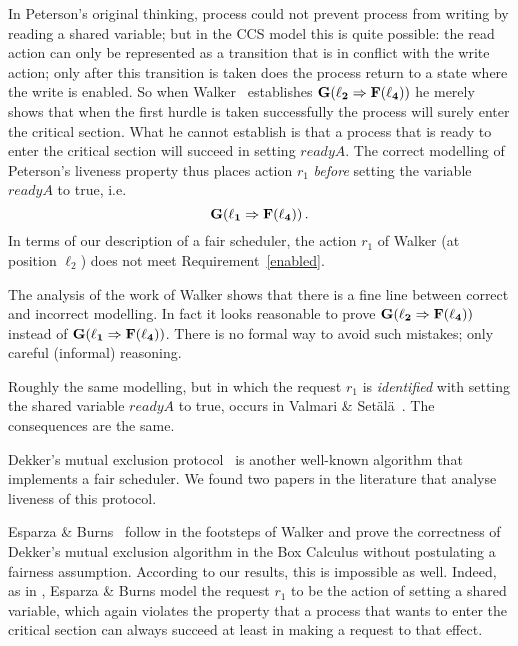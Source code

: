 \documentclass[smallcondensed]{svjour3}
\newcommand{\mand}{\&\xspace}
\begin{document}
In Peterson's
original thinking, process \procB could not prevent process \procA
from writing by reading a shared variable; but in the CCS model this is
quite possible: the read action can only be represented as a transition that is in conflict with the write action;
only after this transition is taken does the process return to a state where the write is enabled.
So when Walker~\cite{Walker89} establishes $\bf{G}(\ell_{2}\Rightarrow{\bf F}(\ell_{4}))$
he merely shows that when the first hurdle is taken successfully
the process will surely enter the critical section. What he cannot establish
is that a process that is ready to enter the
critical section will succeed in setting $readyA$. 
The correct modelling of Peterson's liveness property
thus places action $r_1$ \emph{before} setting the variable $readyA$ to true, i.e.\
\[
\bf{G}(\ell_{1}\Rightarrow{\bf F}(\ell_{4}))\,.
\]
In terms of our description of a fair scheduler, the action $r_1$ of
Walker (at position $\ell_2$) does not meet Requirement~\ref{enabled}.

The analysis of the work of Walker shows that there is a fine line between 
correct and incorrect modelling. In fact it looks reasonable to prove 
$\bf{G}(\ell_{2}\Rightarrow{\bf F}(\ell_{4}))$ instead of 
$\bf{G}(\ell_{1}\Rightarrow{\bf F}(\ell_{4}))$. There is
no formal way to avoid such mistakes; only careful (informal) reasoning.

Roughly the same modelling, but in which the
request $r_1$ is \emph{identified}
with setting the shared variable $readyA$ to true,
occurs in Valmari \mand Set\"{a}l\"{a}~\cite{Valmari96}.
The consequences are the same.

Dekker's mutual exclusion protocol~\cite{EWD35,EWD123} is another well-known algorithm that implements a fair
scheduler. We found two papers in the literature that analyse liveness of this protocol.

Esparza \mand Burns~\cite{EsparzaBruns96}
follow in the footsteps of Walker and prove the correctness of
Dekker's mutual exclusion algorithm in the Box Calculus without
  postulating a fairness assumption. According to our results, this
is impossible as well. Indeed, as in \cite{Valmari96}, Esparza \mand Burns model the request $r_1$
to be the action of setting a shared variable, which again violates the property
that a process that wants to enter the critical section can always
succeed at least in making a request to that effect.
\end{document}

